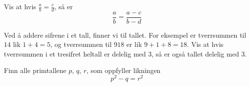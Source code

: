 Vis at hvis $ \frac{a}{b}=\frac{c}{d} $, så er
\[ \frac{a}{b}=\frac{a-c}{b-d} \] 

Ved å addere sifrene i et tall, finner vi  til tallet. For eksempel er tverrsummen til $ 14 $ lik $ 1+4=5 $, og tverrsummen til $ 918 $ er lik $ 9+1+8=18 $. Vis at hvis tverrsummen i et tresifret heltall er delelig med 3, så er også tallet delelig med 3.\vsk


Finn alle primtallene $p$, $q$, $r$, som oppfyller likningen
\[ p^2-q=r^2 \]



